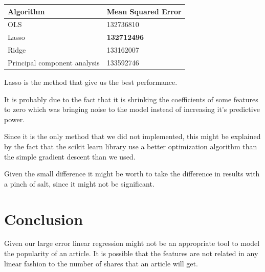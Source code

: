 \documentclass[conference]{IEEEtran}\usepackage[]{graphicx}\usepackage[]{color}
\begin{document}
\begin{center}
    \begin{tabular}{| l | l |}
    \hline
    \textbf{Algorithm} & \textbf{Mean Squared Error}  \\ \hline
    OLS & 132736810 \\ \hline
    Lasso & \textbf{132712496}  \\ \hline
    Ridge & 133162007  \\ \hline
    Principal component analysis & 133592746  \\ \hline
    \end{tabular}
\end{center}

Lasso is the method that give us the best performance. 

It is probably due to the fact that it is shrinking the coefficients of some
features to zero which was bringing noise to the model instead of increasing
it's predictive power.

Since it is the only
method that we did not implemented, this might be explained by the fact that the
scikit learn library use a better optimization algorithm than the simple
gradient descent than we used.


Given the small difference it might be worth to take the difference in results
with a pinch of salt, since it might not be significant.

\section{Conclusion}

Given our large error linear regression might not be an appropriate tool to
model the popularity of an article. It is possible that the features are not
related in any linear fashion to the number of shares that an article will get.






% 
% 
\end{document}
